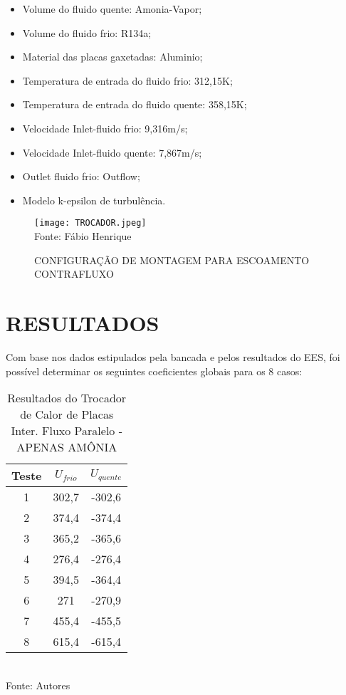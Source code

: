 \documentclass[a4paper,12pt,oneside]{article}
\begin{document}
\begin{flushright}
\begin{itemize}
	\item Volume do fluido quente: Amonia-Vapor;
	\item Volume do fluido frio: R134a;
	\item Material das placas gaxetadas: Aluminio;
	\item Temperatura de entrada do fluido frio: 312,15K;
	\item Temperatura de entrada do fluido quente: 358,15K;
	\item Velocidade Inlet-fluido frio: 9,316m/s;
	\item Velocidade Inlet-fluido quente: 7,867m/s;
	\item Outlet fluido frio: Outflow;
	\item Modelo k-epsilon de turbulência.
\end{itemize}
\vspace{0.5cm}
\begin{figure}[h]
	\centering
	\caption{CONFIGURAÇÃO DE MONTAGEM PARA ESCOAMENTO CONTRAFLUXO}
	\vspace{0.5cm}
	\texttt{[image: TROCADOR.jpeg]}
	\vspace{0.5cm}\\
	Fonte: Fábio Henrique
\end{figure}
\vspace{0.5cm}
\pagebreak
\clearpage
\newpage
\section{\large RESULTADOS}
\vspace{0.5cm}

Com base nos dados estipulados pela bancada e pelos resultados do EES, foi possível determinar os seguintes coeficientes globais para os 8 casos:\\

\begin{table}[h]
	\caption{Resultados do Trocador de Calor de Placas Inter. Fluxo Paralelo - APENAS AMÔNIA}
	\vspace{0.8cm}
	\centering
	\begin{tabular}{| c | c | c |}
		\hline
		Teste & $U_{frio}$ & $U_{quente}$\\
		\hline
		1 & 302,7 & -302,6 \\
		\hline
		2 & 374,4 & -374,4 \\
		\hline
		3 & 365,2 & -365,6 \\
		\hline
		4 & 276,4 & -276,4\\
		\hline
		5 & 394,5 & -364,4\\
		\hline
		6 & 271 & -270,9 \\
		\hline
		7 & 455,4& -455,5 \\
		\hline
		8 & 615,4 & -615,4 \\
		\hline
	\end{tabular}\\
	\vspace{0.8cm}
	Fonte: Autores
	\vspace{1cm}
\end{table}
\pagebreak
\clearpage
\newpage


\end{flushright}
\end{document}
